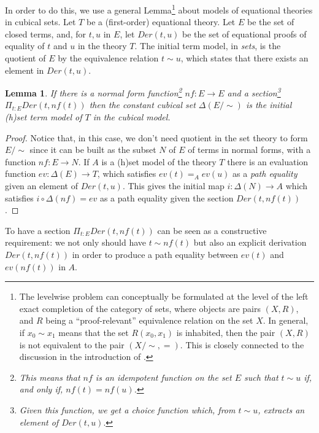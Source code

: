 \documentclass[10pt,a4paper]{article}
\newtheorem{lemma}[theorem]{Lemma}
\theoremstyle{definition}
\theoremstyle{remark}
\begin{document}
In order to do this, we use a general Lemma\footnote{The levelwise problem can conceptually be formulated at the level of the left exact
completion of the category of sets, where objects are pairs $(X,R)$, and $R$ being a ``proof-relevant'' equivalence relation on the set $X$.
In general, if $x_0\sim x_1$ means that the set $R(x_0,x_1)$ is inhabited, then the pair $(X,R)$ is not equivalent to the pair $(X/\sim,=)$.
This is closely connected to the discussion in the introduction of \cite{shulman21}.}
about models of equational theories in cubical sets. Let $T$
be a (first-order) equational theory. Let $E$ be the set of closed terms, and, for $t,u$ in $E$, let $Der(t,u)$ be the set
of equational proofs of equality of $t$ and $u$ in the theory $T$. The initial term model, in {\em sets}, is the quotient of $E$
by the equivalence relation $t\sim u$, which states that there exists an element in $Der(t,u)$.


\begin{lemma}\label{norm}
  If there is a normal form function\footnote{This means that $nf$ is an idempotent function on the set $E$ such that
  $t\sim u$ if, and only if, $nf(t) = nf(u)$.} $nf:E\rightarrow E$ and a section\footnote{Given this function, we get a choice
  function which, from $t\sim u$, extracts an element of $Der(t,u).$} $\Pi_{t:E}Der(t,nf(t))$ then the constant cubical
  set $\Delta(E/\sim)$ is the initial (h)set term model of $T$ in the cubical model.
\end{lemma}

\begin{proof}
Notice that, in this case, we don't need quotient
in the set theory to form $E/\sim$ since it can be built as the subset $N$ of $E$ of terms in normal forms, with a function
$nf:E\rightarrow N$. If $A$ is a (h)set model of the theory $T$ there is an evaluation function $ev:\Delta(E)\rightarrow T$, which
satisfies $ev(t) =_A ev(u)$ as a {\em path equality} given an element of $Der(t,u)$.
This gives the initial map $i:\Delta(N)\rightarrow A$ which satisfies $i\circ \Delta(nf) = ev$ as a path equality given the section
$Der(t,nf(t))$.
\end{proof}

To have a section $\Pi_{t:E}Der(t,nf(t))$ can be seen as a constructive requirement: we not only should have $t\sim nf(t)$ but also
an explicit derivation $Der(t,nf(t))$ in order to produce a path equality between $ev(t)$ and $ev(nf(t))$ in $A$.
\end{document}
